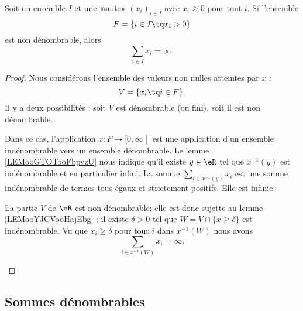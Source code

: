 \begin{lemma}       \label{LEMooQIMGooOUpZjk}
	Soit un ensemble \( I\) et une «suite» \( (x_i)_{i\in I}\) avec \( x_i\geq 0\) pour tout \( i\). Si l'ensemble
	\begin{equation}
		F=\{ i\in I\tq x_i>0 \}
	\end{equation}
	est non dénombrable, alors
	\begin{equation}
		\sum_{i\in I}x_i=\infty.
	\end{equation}
\end{lemma}

\begin{proof}
	Nous considérons l'ensemble des valeurs non nulles atteintes par \( x\) :
	\begin{equation}
		V=\{ x_i\tq i\in F \}.
	\end{equation}
	Il y a deux possibilités : soit \( V\) est dénombrable (ou fini), soit il est non dénombrable.

	\begin{subproof}
		Dans ce cas, l'application \( x\colon F\to \mathopen[ 0 , \infty \mathclose[\) est une application d'un ensemble indénombrable vers un ensemble dénombrable. Le lemme \ref{LEMooGTOTooFbpvzU} nous indique qu'il existe \( y\in \eR\) tel que \( x^{-1}(y)\) est indénombrable et en particulier infini. La somme \( \sum_{i\in x^{-1}(y)}x_i\) est une somme indénombrable de termes tous égaux et strictement positifs. Elle est infinie.

		La partie \( V\) de \( \eR\) est non dénombrable; elle est donc sujette au lemme \ref{LEMooYJCVooHajEbg} : il existe \( \delta>0\) tel que \( W=V\cap\{ x\geq \delta \}\) est indénombrable. Vu que \( x_i\geq \delta\) pour tout \( i\) dans \( x^{-1}(W)\) nous avons
		\begin{equation}
			\sum_{i\in x^{-1}(W)}x_i=\infty.
		\end{equation}
	\end{subproof}
\end{proof}

\subsection{Sommes dénombrables}

